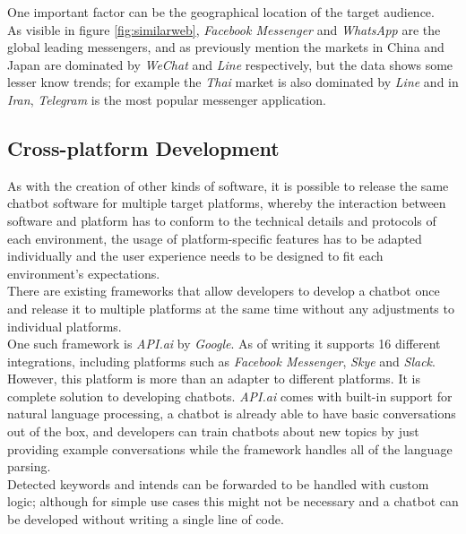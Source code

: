 \label{geography}

One important factor can be the geographical location of the target audience.
\\
As visible in figure \ref{fig:similarweb}, \emph{Facebook Messenger} and \emph{WhatsApp} are the global leading messengers,
and as previously mention the markets in China and Japan are dominated by \emph{WeChat} and \emph{Line} respectively,
but the data shows some lesser know trends; for example the \emph{Thai} market is also dominated by \emph{Line}
and in \emph{Iran}, \emph{Telegram} is the most popular messenger application.


\subsection{Cross-platform Development}
\label{crossplatform}

As with the creation of other kinds of software, it is possible to release the same chatbot software for multiple target platforms,
whereby the interaction between software and platform has to conform to the technical details and protocols of each environment, the usage of platform-specific features has to be adapted individually and the user experience needs to be designed to fit each environment's expectations.
\\

There are existing frameworks that allow developers to develop a chatbot once and release it to multiple platforms at the same time without any adjustments to individual platforms.
\\
One such framework is \emph{API.ai} by \emph{Google}.
As of writing it supports 16 different integrations, including platforms such as \emph{Facebook Messenger}, \emph{Skye} and \emph{Slack}\cite{apiai}.
However, this platform is more than an adapter to different platforms.
It is complete solution to developing chatbots.
\emph{API.ai} comes with built-in support for natural language processing,
a chatbot is already able to have basic conversations out of the box,
and developers can train chatbots about new topics by just providing example conversations while the framework handles all of the language parsing.
\\
Detected keywords and intends can be forwarded to be handled with custom logic;
although for simple use cases this might not be necessary and a chatbot can be developed without writing a single line of code.
\\

